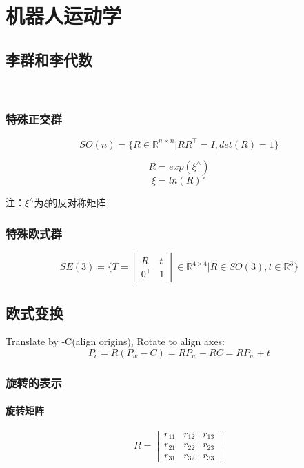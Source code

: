 \chapter{机器人运动学}

\section{李群和李代数}~\citep{Gao2017SLAM}

\subsection{特殊正交群}
\begin{equation}
SO(n) = \{ R \in \mathbb{R}^{n \times n} | RR^\top = I, det(R) = 1\}
\end{equation}

\begin{equation} R = exp({\xi}^{\wedge}) \end{equation}
\begin{equation} \xi = ln(R)^{\vee} \end{equation}

注：${\xi}^{\wedge}$为$\xi$的反对称矩阵

\subsection{特殊欧式群}
\begin{equation}
SE(3) = \{ T = \begin{bmatrix} R & t \\ 0^\top & 1 \end{bmatrix} \in \mathbb{R}^{4 \times 4} | R \in SO(3), t \in \mathbb{R}^{3}\}
\end{equation}


\section{欧式变换}
Translate by -C(align origins), Rotate to align axes:
\begin{equation} P_c = R (P_w - C) = RP_w - RC = RP_w + t \end{equation}

\subsection{旋转的表示}

\subsubsection{旋转矩阵} 
\begin{equation}
R =  \begin{bmatrix} r_{11} &  r_{12} & r_{13} \\  r_{21} & r_{22} & r_{23} \\ r_{31} & r_{32} & r_{33} \end{bmatrix} 
\end{equation}

